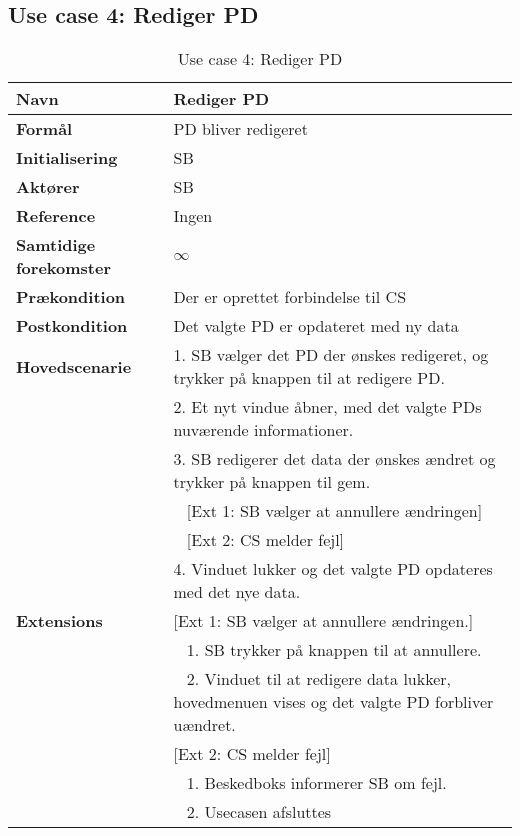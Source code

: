 \subsection{Use case 4: Rediger \gls{PD}}


\begin{table}[H]
\begin{tabularx}{\textwidth}{|l|X|}
\hline
\textbf{Navn}					& Rediger \gls{PD} \\\hline
\textbf{Formål}					& \gls{PD} bliver redigeret \\\hline
\textbf{Initialisering}			& \gls{SB} \\\hline
\textbf{Aktører}				& \gls{SB} \\\hline
\textbf{Reference}				& Ingen \\\hline
								
\textbf{Samtidige forekomster}	& $\infty$ \\
\hline
\textbf{Prækondition}			& Der er oprettet forbindelse til \gls{CS} \\
\hline
\textbf{Postkondition}			& Det valgte \gls{PD} er opdateret med ny data \\
\hline
\textbf{Hovedscenarie}			& 1. \gls{SB} vælger det \gls{PD} der ønskes redigeret, og trykker på knappen til at redigere \gls{PD}.\\
								& 2. Et nyt vindue åbner, med det valgte \gls{PD}s nuværende informationer.\\
								& 3. \gls{SB} redigerer det data der ønskes ændret og trykker på knappen til gem.\\
								& ~ [Ext 1: \gls{SB} vælger at annullere ændringen]\\
								& ~ [Ext 2: \gls{CS} melder fejl]\\
								& 4. Vinduet lukker og det valgte \gls{PD} opdateres med det nye data.\\
\hline
\textbf{Extensions}				& [Ext 1: \gls{SB} vælger at annullere ændringen.] \\
								& ~ 1. \gls{SB} trykker på knappen til at annullere.\\
								& ~ 2. Vinduet til at redigere data lukker, hovedmenuen vises og det valgte \gls{PD} forbliver uændret.\\
								& [Ext 2: \gls{CS} melder fejl] \\
								& ~ 1. Beskedboks informerer \gls{SB} om fejl. \\
								& ~ 2. Usecasen afsluttes \\\hline
								
\end{tabularx}
\caption{Use case 4: Rediger \gls{PD}}
\label{tab:UCrp}
\end{table}